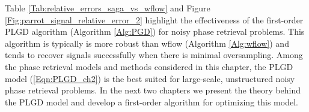 Table \ref{Tab:relative_errors_saga_vs_wflow} and Figure \ref{Fig:parrot_signal_relative_error_2} highlight the effectiveness of the first-order PLGD algorithm (Algorithm \ref{Alg:PGD}) for noisy phase retrieval problems.  
This algorithm is typically is more robust than wflow (Algorithm \ref{Alg:wflow}) and tends to recover signals successfully when there is minimal oversampling. 
Among the phase retrieval models and methods considered in this chapter, the PLGD model (\ref{Eqn:PLGD_ch2}) is the best suited for large-scale, unstructured noisy phase retrieval problems.
In the next two chapters we present the theory behind the PLGD model and develop a first-order algorithm for optimizing this model.



